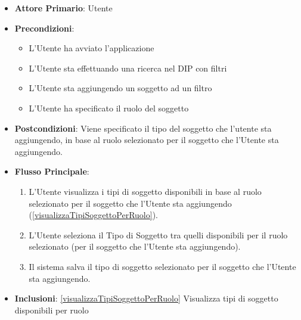 \begin{itemize}
      \item \textbf{Attore Primario}: Utente
      \item \textbf{Precondizioni}: 
      \begin{itemize}
            \item L'Utente ha avviato l'applicazione
            \item L'Utente sta effettuando una ricerca nel DIP con filtri
            \item L'Utente sta aggiungendo un soggetto ad un filtro
            \item L'Utente ha specificato il ruolo del soggetto
      \end{itemize}
      \item \textbf{Postcondizioni}: Viene specificato il tipo del soggetto che l'utente sta aggiungendo, in base al ruolo selezionato per il soggetto che l'Utente sta aggiungendo.
      \item \textbf{Flusso Principale}:
            \begin{enumerate}
                  \item L'Utente visualizza i tipi di soggetto disponibili in base al ruolo selezionato per il soggetto che l'Utente sta aggiungendo (\ref{visualizzaTipiSoggettoPerRuolo}).
                  \item L'Utente seleziona il Tipo di Soggetto tra quelli disponibili per il ruolo selezionato (per il soggetto che l'Utente sta aggiungendo).
                  \item Il sistema salva il tipo di soggetto selezionato per il soggetto che l'Utente sta aggiungendo.
            \end{enumerate}
      \item \textbf{Inclusioni}: \ref{visualizzaTipiSoggettoPerRuolo} Visualizza tipi di soggetto disponibili per ruolo
\end{itemize}

